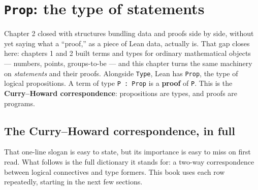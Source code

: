 \section{\texorpdfstring{\texttt{Prop}: the type of statements}{Prop: the type of statements}}\label{sec:03-propositions-and-proofs:01-prop:1}

Chapter 2 closed with structures bundling data and proofs side by side, without yet saying what a ``proof,'' as a piece of Lean data, actually is. That gap closes here: chapters 1 and 2 built terms and types for ordinary mathematical objects --- numbers, points, groups-to-be --- and this chapter turns the same machinery on \emph{statements} and their proofs. Alongside \texttt{Type}, Lean has \texttt{Prop}, the type of logical propositions. A term of type \texttt{P : Prop} is a \textbf{proof} of \texttt{P}. This is the \textbf{Curry--Howard correspondence}: propositions are types, and proofs are programs.

\subsection{The Curry--Howard correspondence, in full}\label{sec:03-propositions-and-proofs:01-prop:2}

That one-line slogan is easy to state, but its importance is easy to miss on first read. What follows is the full dictionary it stands for: a two-way correspondence between logical connectives and type formers. This book uses each row repeatedly, starting in the next few sections.

